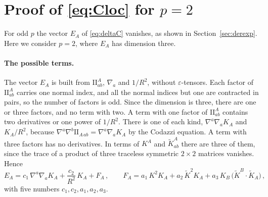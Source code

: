 \documentclass[a4paper,11pt]{article}
\newcommand{\II}{\mathrm{I\!I}}
\newcommand{\Kt}{\widetilde{K}}
\begin{document}
\section{Proof of \eqref{eq:Cloc} for $p=2$}\label{app:local}

For odd $p$ the vector $E_A$ of \eqref{eq:deltaC} vanishes, as shown in Section~\ref{sec:derexp}. Here we consider $p=2$, where $E_A$ has dimension three.

\paragraph{The possible terms.}
The vector $E_A$ is built from $\II^A_{ab}$, $\nabla_a$ and $1/R^2$, without $\varepsilon$-tensors. Each factor of $\II^A_{ab}$ carries one normal index, and all the normal indices but one are contracted in pairs, so the number of factors is odd. Since the dimension is three, there are one or three factors, and no term with two. A term with one factor of $\II^A_{ab}$ contains two derivatives or one power of $1/R^2$. There is one of each kind, $\nabla^a\nabla_aK_A$ and $K_A/R^2$, because $\nabla^a\nabla^b\II_{A\,ab}=\nabla^a\nabla_aK_A$ by the Codazzi equation. A term with three factors has no derivatives. In terms of $K^A$ and $\Kt^A_{ab}$ there are three of them, since the trace of a product of three traceless symmetric $2\times2$ matrices vanishes. Hence
\begin{equation}\label{eq:appE}
	E_A=c_1\,\nabla^a\nabla_aK_A+\frac{c_2}{R^2}\,K_A+F_A\, ,\qquad
	F_A=a_1\,K^2K_A+a_2\,\Kt^2K_A+a_3\,K_B\,\bigl(\Kt^B\!\cdot\!\Kt_A\bigr)\, ,
\end{equation}
with five numbers $c_1,c_2,a_1,a_2,a_3$.
\end{document}
